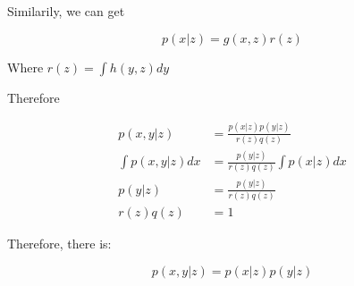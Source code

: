 \documentclass[UTF8]{article}
\begin{document}
Similarily, we can get

$$p(x|z) = g(x,z)r(z)$$

Where $r(z) = \int h(y,z)dy$

Therefore

\begin{align*}
    p(x,y|z) &= \frac{p(x|z)p(y|z)}{r(z)q(z)} \\
    \int p(x,y|z)dx& = \frac{p(y|z)}{r(z)q(z)}\int p(x|z)dx\\
    p(y|z) &= \frac{p(y|z)}{r(z)q(z)}\\
    r(z)q(z) & = 1
\end{align*}

Therefore, there is:

$$p(x,y|z) = p(x|z)p(y|z)$$

\qedsymbol
\end{document}
